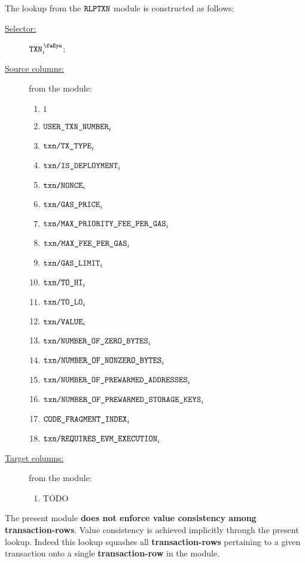 The lookup from the $\texttt{RLPTXN}$ module is constructed as follows:
\begin{description}
	\item[\underline{Selector:}] $\isTxn _{i}$;
	\item[\underline{Source columns:}] from the \rlpTxnMod{} module:
		\begin{multicols}{3}
			\begin{enumerate}
				\item $1$
				\item $\texttt{USER}\texttt{\_}\texttt{TXN\_NUMBER}                       _{i}$
				\item $\texttt{txn}\texttt{/}\texttt{{TX\_TYPE}}               _{i}$
				\item $\texttt{txn}\texttt{/}\texttt{{IS\_DEPLOYMENT}}                _{i}$
				\item $\texttt{txn}\texttt{/}\texttt{{\texttt{NONCE}}}                _{i}$
				\item $\texttt{txn}\texttt{/}\texttt{{GAS\_PRICE}}             _{i}$
				\item $\texttt{txn}\texttt{/}\texttt{{MAX\_PRIORITY\_FEE\_PER\_GAS}} _{i}$
				\item $\texttt{txn}\texttt{/}\texttt{{MAX\_FEE\_PER\_GAS}}         _{i}$
				\item $\texttt{txn}\texttt{/}\texttt{{GAS\_LIMIT}}             _{i}$
				\item $\texttt{txn}\texttt{/}\texttt{{TO\_HI}}                 _{i}$
				\item $\texttt{txn}\texttt{/}\texttt{{TO\_LO}}                 _{i}$
				\item $\texttt{txn}\texttt{/}\texttt{{VALUE}}             _{i}$
				\item $\texttt{txn}\texttt{/}\texttt{{NUMBER\_OF\_ZERO\_BYTES}}         _{i}$
				\item $\texttt{txn}\texttt{/}\texttt{{NUMBER\_OF\_NONZERO\_BYTES}}      _{i}$
				\item $\texttt{txn}\texttt{/}\texttt{{NUMBER\_OF\_PREWARMED\_ADDRESSES}}      _{i}$
				\item $\texttt{txn}\texttt{/}\texttt{{NUMBER\_OF\_PREWARMED\_STORAGE\_KEYS}}   _{i}$
				\item $\texttt{CODE\_FRAGMENT\_INDEX}                                         _{i}$
				\item $\texttt{txn}\texttt{/}\texttt{{REQUIRES\_EVM\_EXECUTION}} _{i}$
			\end{enumerate}
		\end{multicols}
	\item[\underline{Target columns:}] from the \userTxnDataMod{} module: 
		\begin{multicols}{3}
			\begin{enumerate}
				\item TODO
			\end{enumerate} 
		\end{multicols}
\end{description}
\saNote{}
The present module \textbf{does not enforce value consistency among transaction-rows}.
Value consistency is achieved implicitly through the present lookup.
Indeed this lookup squashes all \textbf{transaction-rows} pertaining to a given transaction
onto a single \textbf{transaction-row} in the \rlpTxnMod{} module.
